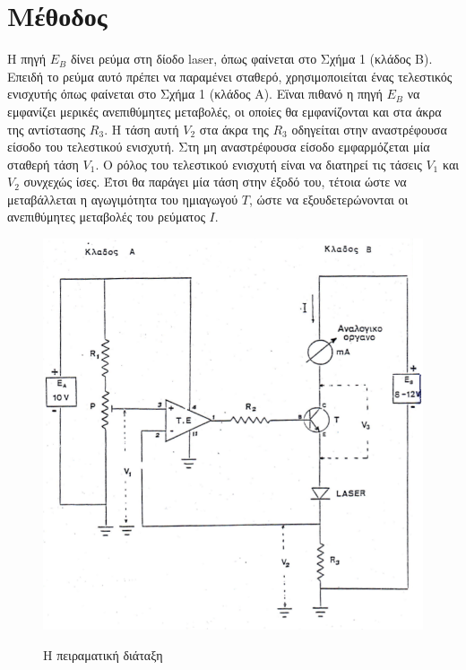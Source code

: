 \documentclass[a4paper,12pt,titlepage]{article}
\makeatletter
\def\maxwidth{
\ifdim\Gin@nat@width>\linewidth
\linewidth
\else
\Gin@nat@width
\fi
}
\makeatother
\begin{document}
\newpage

\section{Μέθοδος}

Η πηγή $E_{B}$ δίνει ρεύμα στη δίοδο laser, όπως φαίνεται στο Σχήμα 1 (κλάδος Β). Επειδή το ρεύμα αυτό πρέπει να παραμένει σταθερό, χρησιμοποιείται ένας τελεστικός ενισχυτής όπως φαίνεται στο Σχήμα 1 (κλάδος Α). Εϊναι πιθανό η πηγή $E_{B}$ να εμφανίζει μερικές ανεπιθύμητες μεταβολές, οι οποίες θα εμφανίζονται και στα άκρα της αντίστασης $R_{3}$. H τάση αυτή $V_{2}$ στα άκρα της $R_{3}$ οδηγείται στην αναστρέφουσα είσοδο του τελεστικού ενισχυτή. Στη μη αναστρέφουσα είσοδο εμφαρμόζεται μία σταθερή τάση $V_{1}$. Ο ρόλος του τελεστικού ενισχυτή είναι να διατηρεί τις τάσεις $V_{1}$ και $V_{2}$ συνχεχώς ίσες. Έτσι θα παράγει μία τάση στην έξοδό του, τέτοια ώστε να μεταβάλλεται η αγωγιμότητα του ημιαγωγού $Τ$, ώστε να εξουδετερώνονται οι ανεπιθύμητες μεταβολές του ρεύματος $Ι$.

\begin{figure}[!h]
\centering
\includegraphics[width=\maxwidth]{diataksi.png}\\[0.3cm]
\caption{Η πειραματική διάταξη}
\end{figure}
\end{document}
